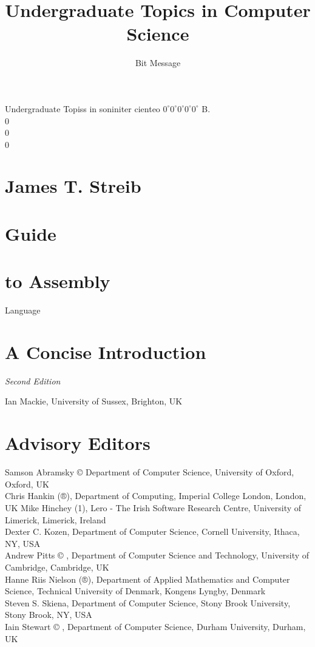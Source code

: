 \documentclass[10pt]{book}
\title{Undergraduate Topics in Computer Science }
\author{Bit Message}
\date{}
\begin{document}
\maketitle
Undergraduate Topiss in soniniter cienteo $0^{\circ} 0^{\circ} 0^{\circ} 0^{\circ} 0^{\circ}$ B.\\
0\\
0\\
0

\section*{James T. Streib}
\section*{Guide}
\section*{to Assembly}
 Language\section*{A Concise Introduction}
\textit{Second Edition}


Ian Mackie, University of Sussex, Brighton, UK

\section*{Advisory Editors}
Samson Abramsky © Department of Computer Science, University of Oxford, Oxford, UK\\
Chris Hankin (®), Department of Computing, Imperial College London, London, UK Mike Hinchey (1), Lero - The Irish Software Research Centre, University of Limerick, Limerick, Ireland\\
Dexter C. Kozen, Department of Computer Science, Cornell University, Ithaca, NY, USA\\
Andrew Pitts © , Department of Computer Science and Technology, University of Cambridge, Cambridge, UK\\
Hanne Riis Nielson (®), Department of Applied Mathematics and Computer Science, Technical University of Denmark, Kongens Lyngby, Denmark\\
Steven S. Skiena, Department of Computer Science, Stony Brook University, Stony Brook, NY, USA\\
Iain Stewart © , Department of Computer Science, Durham University, Durham, UK\\
\end{document}
